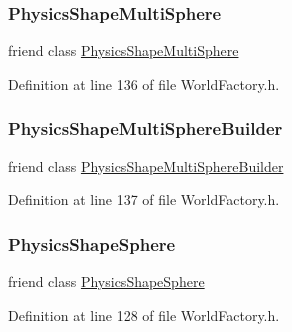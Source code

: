 \subsubsection{\texorpdfstring{Physics\+Shape\+Multi\+Sphere}{PhysicsShapeMultiSphere}}
{\footnotesize\ttfamily friend class \mbox{\hyperlink{classnjli_1_1_physics_shape_multi_sphere}{Physics\+Shape\+Multi\+Sphere}}\hspace{0.3cm}{\ttfamily [friend]}}



Definition at line 136 of file World\+Factory.\+h.

\mbox{\label{classnjli_1_1_world_factory_a71dcdde15201e2df59abaa1bde57e73c}} 
\subsubsection{\texorpdfstring{Physics\+Shape\+Multi\+Sphere\+Builder}{PhysicsShapeMultiSphereBuilder}}
{\footnotesize\ttfamily friend class \mbox{\hyperlink{classnjli_1_1_physics_shape_multi_sphere_builder}{Physics\+Shape\+Multi\+Sphere\+Builder}}\hspace{0.3cm}{\ttfamily [friend]}}



Definition at line 137 of file World\+Factory.\+h.

\mbox{\label{classnjli_1_1_world_factory_aedad28d3885a187a21a94756dd00263c}} 
\subsubsection{\texorpdfstring{Physics\+Shape\+Sphere}{PhysicsShapeSphere}}
{\footnotesize\ttfamily friend class \mbox{\hyperlink{classnjli_1_1_physics_shape_sphere}{Physics\+Shape\+Sphere}}\hspace{0.3cm}{\ttfamily [friend]}}



Definition at line 128 of file World\+Factory.\+h.

